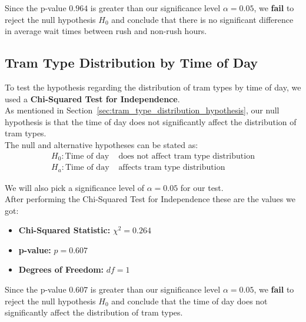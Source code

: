 \documentclass[a4paper, 10pt]{article}
\begin{document}
			\vspace{1mm}
			\noindent Since the p-value \( 0.964 \) is greater than our significance level \( \alpha = 0.05 \), 
			we \textbf{fail} to reject the null hypothesis $H_0$ and conclude that there is no significant difference in average
			wait times between rush and non-rush hours.

		\subsection{Tram Type Distribution by Time of Day}
			\noindent To test the hypothesis regarding the distribution of tram types by time of day, 
			we used a \textbf{Chi-Squared Test for Independence}. \\

			\noindent As mentioned in Section~\ref{sec:tram_type_distribution_hypothesis}, 
			our null hypothesis is that the time of day does not significantly affect the distribution of tram types. \\

			\noindent The null and alternative hypotheses can be stated as:
			\begin{align*}
				H_0: \text{Time of day} &\text{ does not affect tram type distribution} \\
				H_a: \text{Time of day} &\text{ affects tram type distribution}
			\end{align*}

			\noindent We will also pick a significance level of \( \alpha = 0.05 \) for our test. \\

			After performing the Chi-Squared Test for Independence these are the values we got:
			\begin{itemize}
				\item \textbf{Chi-Squared Statistic:} \( \chi^2 = 0.264 \)
				\item \textbf{p-value:} \( p = 0.607 \)
				\item \textbf{Degrees of Freedom:} \( df = 1 \)
			\end{itemize}

			\vspace{1mm}
			\noindent Since the p-value \( 0.607 \) is greater than our significance level \( \alpha = 0.05 \), 
			we \textbf{fail} to reject the null hypothesis $H_0$ and conclude that the time of day does not 
			significantly affect the distribution of tram types. \\

	
	\newpage
\end{document}
